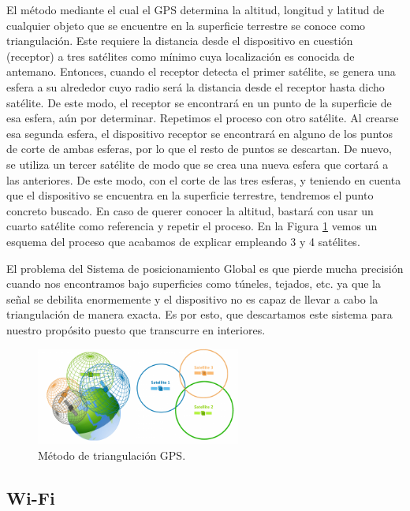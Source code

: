 El método mediante el cual el GPS determina la altitud, longitud y latitud de cualquier objeto que se encuentre en la superficie terrestre se conoce como triangulación. Este requiere la distancia desde el dispositivo en cuestión (receptor) a tres satélites como mínimo cuya localización es conocida de antemano. Entonces, cuando el receptor detecta el primer satélite, se genera una esfera a su alrededor cuyo radio será la distancia desde el receptor hasta dicho satélite. De este modo, el receptor se encontrará en un punto de la superficie de esa esfera, aún por determinar. Repetimos el proceso con otro satélite. Al crearse esa segunda esfera, el dispositivo receptor se encontrará en alguno de los puntos de corte de ambas esferas, por lo que el resto de puntos se descartan. De nuevo, se utiliza un tercer satélite de modo que se crea una nueva esfera que cortará a las
anteriores. De este modo, con el corte de las tres esferas, y teniendo en cuenta que el dispositivo se encuentra en la superficie terrestre, tendremos el punto concreto buscado. En caso de querer conocer la altitud, bastará con usar un cuarto satélite como referencia y repetir el proceso. En la Figura \ref{fig:ejemplogps} vemos un esquema del proceso que acabamos de explicar empleando 3 y 4 satélites.

El problema del Sistema de posicionamiento Global es que pierde mucha precisión cuando nos encontramos bajo superficies como túneles, tejados, etc. ya que la señal se debilita enormemente y el dispositivo no es capaz de llevar a cabo la triangulación de manera exacta. Es por esto, que descartamos este sistema para nuestro propósito puesto que transcurre en interiores.

\begin{figure}[t]
	\centering
	\includegraphics[width=0.6\textwidth]{Imagenes/Estadodelacuestion/triangulacion}
	\caption{Método de triangulación GPS. }
	\label{fig:ejemplogps}
\end{figure}


\subsection{Wi-Fi}

